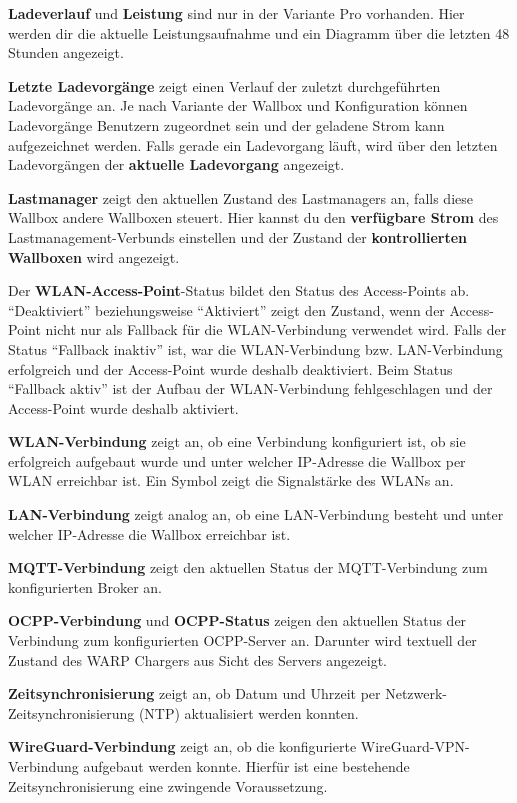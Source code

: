 \documentclass[a4paper,10pt]{article}
\begin{document}
\begin{multicols*}{2}
    \textbf{Ladeverlauf} und \textbf{Leistung} sind nur in der Variante Pro
    vorhanden. Hier werden dir die aktuelle Leistungsaufnahme und ein Diagramm über
    die letzten 48 Stunden angezeigt.

    \textbf{Letzte Ladevorgänge} zeigt einen Verlauf der zuletzt durchgeführten Ladevorgänge an.
    Je nach Variante der Wallbox und Konfiguration können Ladevorgänge Benutzern zugeordnet sein
    und der geladene Strom kann aufgezeichnet werden. Falls gerade ein Ladevorgang läuft, wird über den letzten Ladevorgängen der \textbf{aktuelle Ladevorgang} angezeigt.

    \textbf{Lastmanager} zeigt den aktuellen Zustand des Lastmanagers an, falls diese Wallbox
    andere Wallboxen steuert. Hier kannst du den \textbf{verfügbare Strom} des Lastmanagement-Verbunds
    einstellen und der Zustand der \textbf{kontrollierten Wallboxen} wird angezeigt.


    Der \textbf{WLAN-Access-Point}-Status bildet den Status des Access-Points ab.
    \enquote{Deaktiviert} beziehungsweise \enquote{Aktiviert} zeigt den Zustand, wenn der Access-Point nicht
    nur als Fallback für die WLAN-Verbindung verwendet wird. Falls der Status \enquote{Fallback inaktiv} ist,
    war die WLAN-Verbindung bzw. LAN-Verbindung erfolgreich und der Access-Point wurde deshalb deaktiviert.
    Beim Status \enquote{Fallback aktiv} ist der Aufbau der WLAN-Verbindung fehlgeschlagen und der
    Access-Point wurde deshalb aktiviert.

    \textbf{WLAN-Verbindung} zeigt an, ob eine Verbindung konfiguriert ist, ob sie erfolgreich aufgebaut wurde und
    unter welcher IP-Adresse die Wallbox per WLAN erreichbar ist. Ein Symbol
    zeigt die Signalstärke des WLANs an.

    \textbf{LAN-Verbindung} zeigt analog an, ob eine LAN-Verbindung besteht und unter welcher IP-Adresse die Wallbox erreichbar ist.

    \textbf{MQTT-Verbindung} zeigt den aktuellen Status der MQTT-Verbindung
    zum konfigurierten Broker an.

    \textbf{OCPP-Verbindung} und \textbf{OCPP-Status} zeigen den aktuellen Status der Verbindung zum konfigurierten OCPP-Server an.
    Darunter wird textuell der Zustand des WARP Chargers aus Sicht des Servers angezeigt.

    \textbf{Zeitsynchronisierung} zeigt an, ob Datum und Uhrzeit per Netzwerk-Zeitsynchronisierung (NTP) aktualisiert werden konnten.

    \textbf{WireGuard-Verbindung} zeigt an, ob die konfigurierte WireGuard-VPN-Verbindung aufgebaut werden konnte. Hierfür ist eine bestehende Zeitsynchronisierung eine zwingende Voraussetzung.




\end{multicols*}
\end{document}
